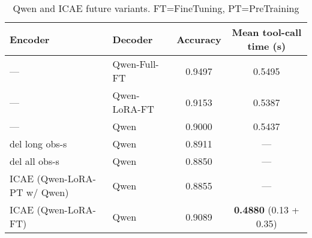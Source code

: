 \documentclass{article}
\begin{document}
%

\begin{table}[h]
    \centering
    \setlength{\tabcolsep}{6pt}
    \begin{tabular}{llcc}
        \toprule
        \textbf{Encoder} & \textbf{Decoder} & \textbf{Accuracy} & \textbf{Mean tool-call time (s)} \\
        \midrule
        —                           & Qwen-Full-FT   & 0.9497 & 0.5495 \\
        —                           & Qwen-LoRA-FT   & 0.9153 & 0.5387 \\
        —                           & Qwen           & 0.9000 & 0.5437 \\
        del long obs-s              & Qwen           & 0.8911 & — \\
        del all obs-s               & Qwen           & 0.8850 & — \\
        ICAE (Qwen-LoRA-PT w/ Qwen)      & Qwen           & 0.8855 & — \\
        ICAE (Qwen-LoRA-FT)         & Qwen           & 0.9089 & \textbf{0.4880} (0.13 + 0.35) \\        
        
        \bottomrule
    \end{tabular}
    \caption{Qwen and ICAE future variants. FT=FineTuning, PT=PreTraining}
    \label{tab:qwen_icae_variants}
\end{table}
\end{document}
